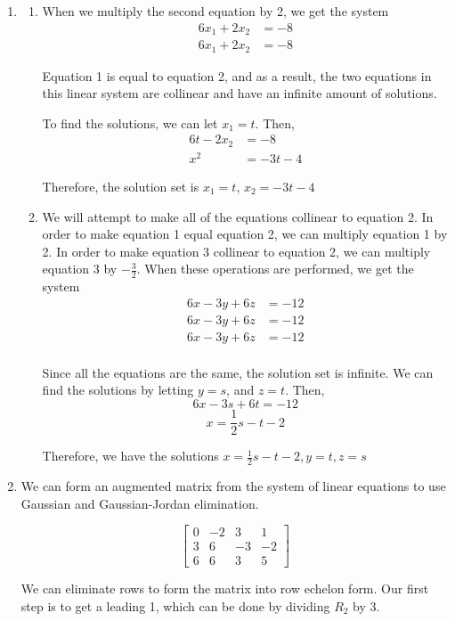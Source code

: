 \documentclass[11pt, letterpaper, twoside]{article}
\begin{document}
\begin{enumerate}
\item \begin{enumerate}[label=(\alph*)]
\item When we multiply the second equation by 2, we get the system
\begin{align*}
6x_1 + 2x_2 &=  -8 \\
6x_1 + 2x_2 &=  -8
\end{align*}

Equation 1 is equal to equation 2, and as a result, the two equations in this linear system are collinear and have an infinite amount of solutions.

To find the solutions, we can let $x_1=t$. Then,
\begin{align*}
6t-2x_2&=-8\\
x^2&=-3t-4
\end{align*}

Therefore, the solution set is $x_1=t$, $x_2=-3t-4$

\item We will attempt to make all of the equations collinear to equation 2. In order to make equation 1 equal equation 2, we can multiply equation 1 by 2. In order to make equation 3 collinear to equation 2, we can multiply equation 3 by $-\frac{3}{2}$. When these operations are performed, we get the system
\begin{align*}
6x-3y+6z&=-12 \\
6x-3y+6z&=-12 \\
6x-3y+6z&=-12 \\
\end{align*}

Since all the equations are the same, the solution set is infinite. We can find the solutions by letting $y=s$, and $z=t$. Then,
$$ 6x-3s+6t=-12$$
$$ x=\frac{1}{2}s-t-2$$

Therefore, we have the solutions $x=\frac{1}{2}s-t-2, y=t, z=s$
\end{enumerate}


\item We can form an augmented matrix from the system of linear equations to use Gaussian and Gaussian-Jordan elimination.

$$\begin{bmatrix}
0 & -2 & 3 & 1\\
3 & 6 & -3 & -2\\
6 & 6 & 3 & 5
\end{bmatrix}$$

We can eliminate rows to form the matrix into row echelon form. Our first step is to get a leading 1, which can be done by dividing $R_2$ by 3.


\end{enumerate}
\end{document}
